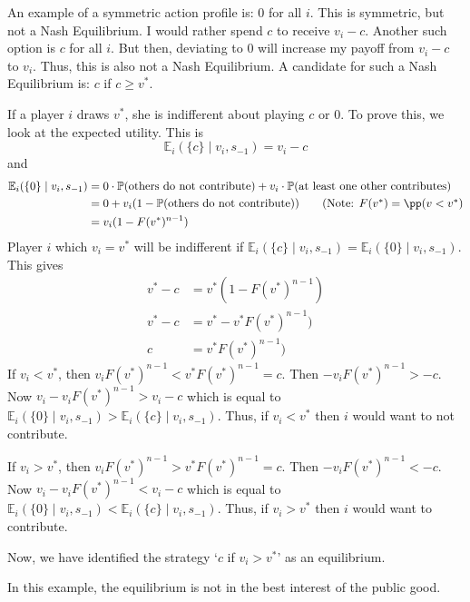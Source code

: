 \begin{example}
      An example of a symmetric action profile is: $0$ for all $i$. 
      This is symmetric, but not a Nash Equilibrium. 
      I would rather spend $c$ to receive $v_i - c$. 
      Another such option is $c$ for all $i$. 
      But then, deviating to $0$ will increase my payoff from $v_i - c$ to $v_i$. 
      Thus, this is also not a Nash Equilibrium. 
      A candidate for such a Nash Equilibrium is: $c$ if $c \ge v^{*}$.

      If a player $i$ draws $v^{*}$, she is indifferent about playing $c$ or $0$. To prove this, we look at the expected utility. This is
      \[
            \mathbb{E}_i(\{c\} \mid v_i, s_{-1}) = v_i -c
      \]
      and
      \begin{align*}
            \mathbb{E}_i(\{0\} \mid v_i, s_{-1}) & = 0\cdot\mathbb{P}(\text{others do not contribute}) + v_i \cdot \mathbb{P}(\text{at least one other contributes})
            \\&=
            0 + v_i(1 - \mathbb{P}(\text{others do not contribute})) \tag{Note: $F(v^{*}) =\pp (v < v^{*}$}
            \\&=
            v_i(1 - F(v^{*})^{n-1})
      \end{align*}
      Player $i$ which $v_i = v^{*}$ will be indifferent if $\mathbb{E}_i(\{c\} \mid v_i, s_{-1}) = \mathbb{E}_i(\{0\} \mid v_i, s_{-1})$. This gives
      \begin{align*}
            v^{*} -c & = v^{*}(1 - F(v^{*})^{n-1})
            \\
            v^{*} -c & = v^{*} - v^{*}F(v^{*})^{n-1})
            \\
            c        & = v^{*}F(v^{*})^{n-1})
      \end{align*}
      If $v_i < v^{*}$, then $v_iF(v^{*})^{n-1} <  v^{*} F(v^{*})^{n-1} = c$. Then $-v_iF(v^{*})^{n-1}  > -c$. Now $v_i-v_iF(v^{*})^{n-1}  > v_i-c$ which is equal to $\mathbb{E}_i(\{0\} \mid v_i, s_{-1}) > \mathbb{E}_i(\{c\} \mid v_i, s_{-1})$. Thus, if $v_i < v^{*}$ then $i$ would want to not contribute.

      If $v_i > v^{*}$, then $v_iF(v^{*})^{n-1} >  v^{*} F(v^{*})^{n-1} = c$. Then $-v_iF(v^{*})^{n-1}  < -c$. Now $v_i-v_iF(v^{*})^{n-1}  < v_i-c$ which is equal to $\mathbb{E}_i(\{0\} \mid v_i, s_{-1}) < \mathbb{E}_i(\{c\} \mid v_i, s_{-1})$. Thus, if $v_i > v^{*}$ then $i$ would want to contribute.

      Now, we have identified the strategy `$c$ if $v_i > v^{*}$' as an equilibrium.
\end{example}


\begin{remark}
      In this example, the equilibrium is not in the best interest of the public good.
\end{remark}
